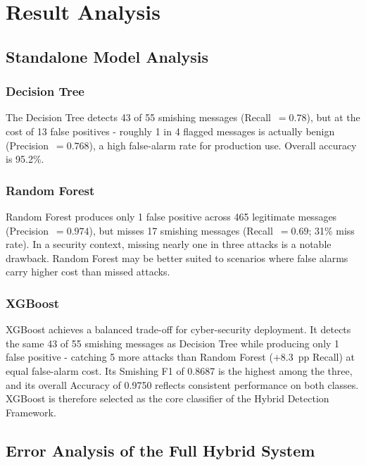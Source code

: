 \documentclass[conference]{IEEEtran}
\begin{document}
\section{Result Analysis}
\label{sec:result_analysis}
 
\subsection{Standalone Model Analysis}
 
\subsubsection*{Decision Tree}
The Decision Tree detects 43 of 55 smishing messages
(Recall~$= 0.78$), but at the cost of 13 false positives - roughly
1 in 4 flagged messages is actually benign (Precision~$= 0.768$), a
high false-alarm rate for production use. Overall accuracy is 95.2\%.
 
\subsubsection*{Random Forest}
Random Forest produces only 1 false positive across 465 legitimate
messages (Precision~$= 0.974$), but misses 17 smishing messages
(Recall~$= 0.69$; 31\% miss rate). In a security context, missing nearly
one in three attacks is a notable drawback. Random Forest may be better
suited to scenarios where false alarms carry higher cost than missed attacks.
 
\subsubsection*{XGBoost}
XGBoost achieves a balanced trade-off for cyber-security deployment. It
detects the same 43 of 55 smishing messages as Decision Tree
while producing only 1 false positive - catching 5 more
attacks than Random Forest ($+$8.3~pp Recall) at equal false-alarm cost.
Its Smishing F1 of 0.8687 is the highest among the three, and its
overall Accuracy of 0.9750 reflects consistent performance on both
classes. XGBoost is therefore selected as the core classifier of the
Hybrid Detection Framework.
 
\subsection{Error Analysis of the Full Hybrid System}
\label{subsec:error}
 
\end{document}
